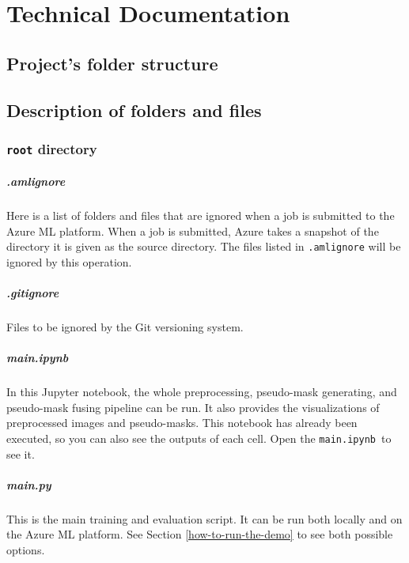 \chapter{Technical Documentation \label{appendix:td} }
\renewcommand{\thepage}{B-\arabic{page}}
\setcounter{page}{1}

\section{Project's folder structure}
\label{projects-folder-structure}



\section{Description of folders and
files}\label{sec:description-of-folders-and-files}

\subsection{\texttt{root} directory}\label{root-directory-files}

\paragraph{.amlignore}
Here is a list of folders and files that are ignored when a job is
submitted to the Azure ML platform. When a job is submitted, Azure takes
a snapshot of the directory it is given as the source directory. The
files listed in \texttt{.amlignore} will be ignored by this operation.

\paragraph{.gitignore}
Files to be ignored by the Git versioning system.

\paragraph{main.ipynb}
In this Jupyter notebook, the whole preprocessing, pseudo-mask generating, and pseudo-mask fusing pipeline can be run. It also provides
the visualizations of preprocessed images and pseudo-masks. This notebook has already been executed, so you can also see the outputs of each cell. Open
the \texttt{main.ipynb }to see it.

\paragraph{main.py}
This is the main training and evaluation script. It can be run both
locally and on the Azure ML platform. See Section \ref{how-to-run-the-demo} to see both possible
options.

